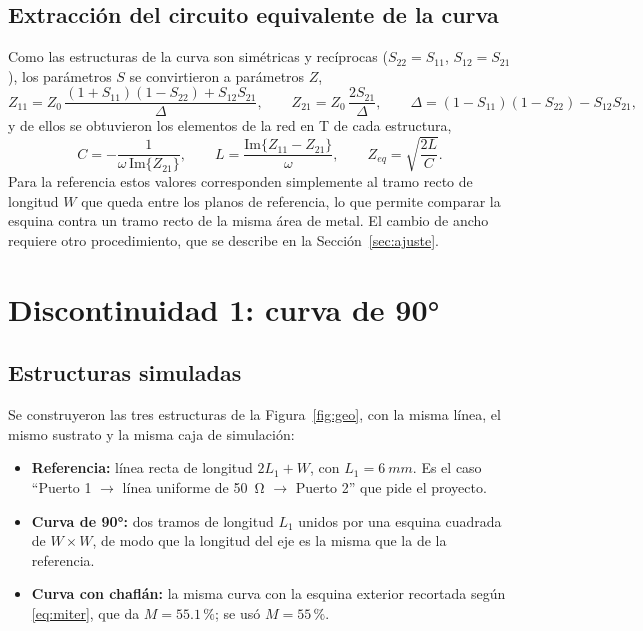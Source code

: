 \documentclass[11pt,letterpaper]{article}
\begin{document}
\subsection{Extracción del circuito equivalente de la curva}
\label{sec:extraccion}
Como las estructuras de la curva son simétricas y recíprocas ($S_{22}=S_{11}$, $S_{12}=S_{21}$), los parámetros $S$ se convirtieron a parámetros $Z$,
\begin{equation}
Z_{11} = Z_0\,\frac{(1+S_{11})(1-S_{22})+S_{12}S_{21}}{\Delta}, \qquad
Z_{21} = Z_0\,\frac{2S_{21}}{\Delta}, \qquad
\Delta = (1-S_{11})(1-S_{22})-S_{12}S_{21},
\label{eq:zparam}
\end{equation}
y de ellos se obtuvieron los elementos de la red en T de cada estructura,
\begin{equation}
C = -\frac{1}{\omega\,\mathrm{Im}\{Z_{21}\}}, \qquad
L = \frac{\mathrm{Im}\{Z_{11}-Z_{21}\}}{\omega}, \qquad
Z_{eq} = \sqrt{\frac{2L}{C}}.
\label{eq:LC}
\end{equation}
Para la referencia estos valores corresponden simplemente al tramo recto de longitud $W$ que queda entre los planos de referencia, lo que permite comparar la esquina contra un tramo recto de la misma área de metal. El cambio de ancho requiere otro procedimiento, que se describe en la Sección~\ref{sec:ajuste}.


\section{Discontinuidad 1: curva de \ang{90}}

\label{sec:d1}

\subsection{Estructuras simuladas}
Se construyeron las tres estructuras de la Figura~\ref{fig:geo}, con la misma línea, el mismo sustrato y la misma caja de simulación:
\begin{itemize}
\item \textbf{Referencia:} línea recta de longitud $2L_1+W$, con $L_1=\SI{6}{mm}$. Es el caso ``Puerto 1 $\rightarrow$ línea uniforme de \SI{50}{\ohm} $\rightarrow$ Puerto 2'' que pide el proyecto.
\item \textbf{Curva de \ang{90}:} dos tramos de longitud $L_1$ unidos por una esquina cuadrada de $W\times W$, de modo que la longitud del eje es la misma que la de la referencia.
\item \textbf{Curva con chaflán:} la misma curva con la esquina exterior recortada según \eqref{eq:miter}, que da $M=55.1\,\%$; se usó $M=55\,\%$.
\end{itemize}
\end{document}
